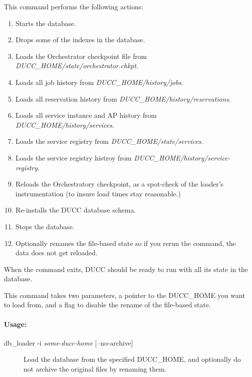         This command performs the following actions:
        \begin{enumerate}
          \item Starts the database.
          \item Drops some of the indexes in the database.
          \item Loads the Orchestrator checkpoint file from {\em DUCC\_HOME/state/orchestrator.chkpt}.
          \item Loads all job history from {\em DUCC\_HOME/history/jobs}.
          \item Loads all reservation history from {\em DUCC\_HOME/history/reservations}.
          \item Loads all service instance and AP history from {\em DUCC\_HOME/history/services}.
          \item Loads the service registry from {\em DUCC\_HOME/state/services}.
          \item Loads the service registry histroy from {\em DUCC\_HOME/history/service-registry}.  
          \item Reloads the Orchestratory checkpoint, as a spot-check of the loader's instrumentation (to insure
            load times stay reasonable.)
          \item Re-installs the DUCC database schema.
          \item Stops the database.
          \item Optionally renames the file-based state so if you rerun the command, the data does not get reloaded.
        \end{enumerate}
        
        When the command exits, DUCC should be ready to run with all its state in the database.

        This command takes two parameters, a pointer to the DUCC\_HOME you want to load from, and
        a flag to disable the rename of the file-based state.

    \paragraph{Usage:}
    \begin{description}
    \item[db\_loader -i {\em some-ducc-home} {[--no-archive]}]
      Load the database from the specified DUCC\_HOME, and optionally do not archive the original files
      by renaming them.  
    \end{description}


